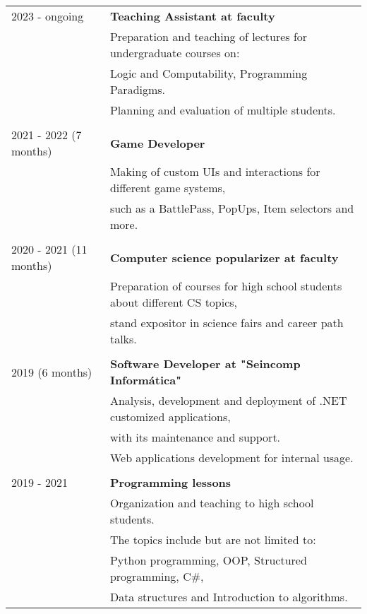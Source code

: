 \documentclass{article}
\begin{document}
\begin{tabular}{l | l}
    2023 - ongoing  & \textbf{Teaching Assistant at faculty} \\
                            & Preparation and teaching of lectures for undergraduate courses on: \\
                            & Logic and Computability, Programming Paradigms. \\ 
                            & Planning and evaluation of multiple students. \\
                            \\
    2021 - 2022 (7 months) & \textbf{Game Developer} \\
                            & Making of custom UIs and interactions for different game systems, \\
                            & such as a BattlePass, PopUps, Item selectors and more. \\
                            \\
    2020 - 2021 (11 months) & \textbf{Computer science popularizer at faculty} \\
                            & Preparation of courses for high school students about different CS topics, \\ 
                            & stand expositor in science fairs and career path talks. \\
                            \\
    2019 (6 months) & \textbf{Software Developer at "Seincomp Informática"} \\
                    &  Analysis, development and deployment of .NET customized applications, \\ 
                    & with its maintenance and support. \\
                    & Web applications development for internal usage.\\
                    \\
    2019 - 2021     & \textbf{Programming lessons}  \\
                    & Organization and teaching to high school students. \\
                    & The topics include but are not limited to: \\ 
                    & Python programming, OOP, Structured programming, C\#, \\ 
                    & Data structures and Introduction to algorithms.
\end{tabular}
\end{document}
